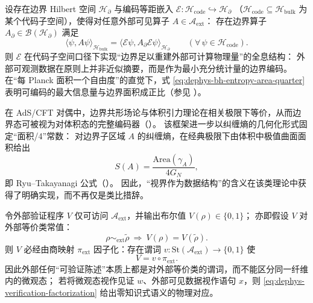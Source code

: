 \begin{theorem}\label{thm:dephys-holography-sufficient-statistic}
设存在边界 Hilbert 空间 \(\mathcal{H}_{\partial}\) 与编码等距嵌入
\(
\mathcal{E}:\mathcal{H}_{\mathrm{code}}\hookrightarrow \mathcal{H}_{\partial}
\)
（\(\mathcal{H}_{\mathrm{code}}\subseteq\mathcal{H}_{\mathrm{bulk}}\) 为某个代码子空间），使得对任意外部可见算子 \(A\in\mathcal{A}_{\mathrm{ext}}\)：
存在边界算子 \(A_{\partial}\in\mathcal{B}(\mathcal{H}_{\partial})\) 满足
\begin{equation}\label{eq:dephys-holography-reconstruction}
\boxed{\;
\langle\psi, A\psi\rangle_{\mathcal{H}_{\mathrm{bulk}}}
=
\langle\mathcal{E}\psi, A_{\partial}\mathcal{E}\psi\rangle_{\mathcal{H}_{\partial}}
\qquad(\forall\,\psi\in\mathcal{H}_{\mathrm{code}}).\;}
\end{equation}
则 \(\mathcal{E}\) 在代码子空间口径下实现“边界足以重建外部可计算物理量”的全息结构：
外部可观测数据在原则上并非近似摘要，而是作为最小充分统计量的边界编码。
在“每 Planck 面积一个自由度”的直觉下，式 \eqref{eq:dephys-bh-entropy-area-quarter} 表明可编码的最大信息量与边界面积成正比（参见 \cite{tHooft1993DimensionalReductionQuantumGravity,Susskind1995WorldAsHologram}）。
\end{theorem}

\begin{remark}\label{rem:dephys-adscft-explicit-encoder}
在 AdS/CFT 对偶中，边界共形场论与体积引力理论在相关极限下等价，从而边界态可被视为对体积态的完整编码器（\cite{Maldacena1999LargeN}）。
该框架进一步以纠缠熵的几何化形式固定“面积/4”常数：
对边界子区域 \(A\) 的纠缠熵，在经典极限下由体积中极值曲面面积给出
\[
S(A)=\frac{\mathrm{Area}(\gamma_A)}{4G_N},
\]
即 Ryu--Takayanagi 公式（\cite{RyuTakayanagi2006HolographicEntanglementEntropy}）。
因此，“视界作为数据结构”的含义在该类理论中获得了明确实现，而不再仅是类比措辞。
\end{remark}

\begin{proposition}\label{prop:dephys-zero-knowledge-quotient-factorization}
令外部验证程序 \(V\) 仅可访问 \(\mathcal{A}_{\mathrm{ext}}\)，并输出布尔值 \(V(\rho)\in\{0,1\}\)；
亦即假设 \(V\) 对外部等价类常值：
\[
\rho\sim_{\mathrm{ext}}\tilde\rho\ \Longrightarrow\ V(\rho)=V(\tilde\rho).
\]
则 \(V\) 必经由商映射 \(\pi_{\mathrm{ext}}\) 因子化：存在谓词
\(
v:\mathrm{St}(\mathcal{A}_{\mathrm{ext}})\to\{0,1\}
\)
使
\begin{equation}\label{eq:dephys-verification-factorization}
\boxed{\;
V=v\circ \pi_{\mathrm{ext}}.\;}
\end{equation}
因此外部任何“可验证陈述”本质上都是对外部等价类的谓词，而不能区分同一纤维内的微观态；
若将微观态视作见证 \(w\)、外部可见数据视作语句 \(x\)，则 \eqref{eq:dephys-verification-factorization} 给出零知识式语义的物理对应。
\end{proposition}

